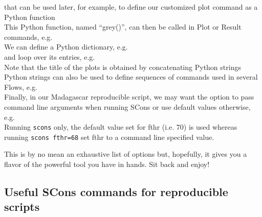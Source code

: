 \noindent that can be used later, for example, to define our customized plot
command as a Python function\\



This Python function, named ``grey()'', can then be called in Plot or Result
commands, e.g.\\



We can define a Python dictionary, e.g.\\



\noindent and loop over its entries, e.g.\\



Note that the title of the plots is obtained by concatenating Python
strings\\



Python strings can also be used to define sequences of commands used
in several Flows, e.g.\\



Finally, in our Madagascar reproducible script, we may want the option
to pass command line arguments when running SCons or use default
values otherwise, e.g.\\



Running \texttt{scons} only, the default value set for fthr (i.e. 70)
is used whereas running \texttt{scons fthr=68} set fthr to a command
line specified value.

This is by no mean an exhaustive list of options but, hopefully, it
gives you a flavor of the powerful tool you have in hands. Sit back
and enjoy!

\subsection{Useful SCons commands for reproducible scripts}

